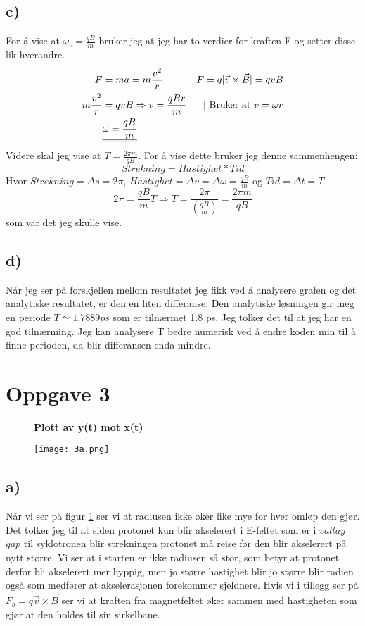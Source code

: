 \documentclass[a4paper,12pt,norsk]{article}
\begin{document}
\subsection{c)}
For å vise at $\omega_c = \frac{qB}{m}$ bruker jeg at jeg har to verdier for kraften F og setter disse lik hverandre.
\begin{align*}
F &=ma = m\frac{v^2}{r}
&F = q |\vec{v} \times \vec{B}| = qvB \\
m\frac{v^2}{r} &= qvB \Rightarrow v =  \frac{qBr}{m}  &\text{| Bruker at } v = \omega r\\
&\underline{\underline{\omega = \frac{qB}{m}}}
\end{align*}
Videre skal jeg vise at $T = \frac{2\pi m}{qB}$. For å vise dette bruker jeg denne sammenhengen:
$$Strekning = Hastighet*Tid$$
Hvor $Strekning = \Delta s = 2\pi$, $Hastighet = \Delta v = \Delta \omega = \frac{qB}{m}$ og $Tid = \Delta t = T$
$$
2\pi = \frac{qB}{m}T \Rightarrow T = \frac{2\pi}{( \frac{qB}{m})} = \frac{2\pi m}{qB}
$$
som var det jeg skulle vise.\\

\subsection{d)}
Når jeg ser på forskjellen mellom resultatet jeg fikk ved å analysere grafen og det analytiske resultatet, er den en liten differanse. Den analytiske løsningen gir meg en periode $T \simeq 1.7889ps$ som er tilnærmet 1.8 ps. Jeg tolker det til at jeg har en god tilnærming. Jeg kan analysere T bedre numerisk ved å endre koden min til å finne perioden, da blir differansen enda mindre. 



\section{Oppgave 3}


\begin{figure}
\centering
\textbf{Plott av y(t) mot x(t)}\par\medskip
\texttt{[image: 3a.png]} 
\caption{}
\label{3a}
\end{figure}

\subsection{a)}
Når vi ser på figur \ref{3a} ser vi at radiusen ikke øker like mye for hver omløp den gjør. Det tolker jeg til at siden protonet kun blir akselerert i E-feltet som er i $vallay$ $gap$ til syklotronen blir strekningen protonet må reise før den blir akselerert på nytt større. Vi ser at i starten er ikke radiusen så stor, som betyr at protonet derfor bli akselerert mer hyppig, men jo større hastighet blir jo større blir radien også som medfører at akselerasjonen forekommer sjeldnere.  Hvis vi i tillegg ser på $F_b = q\vec{v} \times \vec{B}$ ser vi at kraften fra magnetfeltet øker sammen med hastigheten som gjør at den holdes til sin sirkelbane.\\
\end{document}
